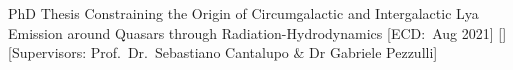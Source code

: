 \begin{cvsection}{PhD Thesis}
    \cvitem
    {Constraining the Origin of Circumgalactic and Intergalactic Lya Emission around Quasars through Radiation-Hydrodynamics}
    [ECD:~Aug 2021]
    [\ipa]
    [Supervisors: Prof.\ Dr.\ Sebastiano Cantalupo \& Dr Gabriele Pezzulli]
\end{cvsection}